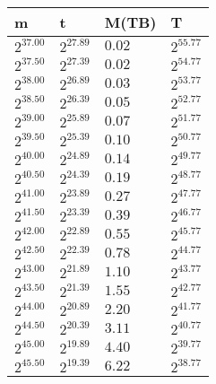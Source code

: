 \begin{tabular}{llll}
m & t & M(TB) & T \\ \hline
$2^{37.00}$ & $2^{27.89}$ & $0.02$ & $2^{55.77}$ \\
$2^{37.50}$ & $2^{27.39}$ & $0.02$ & $2^{54.77}$ \\
$2^{38.00}$ & $2^{26.89}$ & $0.03$ & $2^{53.77}$ \\
$2^{38.50}$ & $2^{26.39}$ & $0.05$ & $2^{52.77}$ \\
$2^{39.00}$ & $2^{25.89}$ & $0.07$ & $2^{51.77}$ \\
$2^{39.50}$ & $2^{25.39}$ & $0.10$ & $2^{50.77}$ \\
$2^{40.00}$ & $2^{24.89}$ & $0.14$ & $2^{49.77}$ \\
$2^{40.50}$ & $2^{24.39}$ & $0.19$ & $2^{48.77}$ \\
$2^{41.00}$ & $2^{23.89}$ & $0.27$ & $2^{47.77}$ \\
$2^{41.50}$ & $2^{23.39}$ & $0.39$ & $2^{46.77}$ \\
$2^{42.00}$ & $2^{22.89}$ & $0.55$ & $2^{45.77}$ \\
$2^{42.50}$ & $2^{22.39}$ & $0.78$ & $2^{44.77}$ \\
$2^{43.00}$ & $2^{21.89}$ & $1.10$ & $2^{43.77}$ \\
$2^{43.50}$ & $2^{21.39}$ & $1.55$ & $2^{42.77}$ \\
$2^{44.00}$ & $2^{20.89}$ & $2.20$ & $2^{41.77}$ \\
$2^{44.50}$ & $2^{20.39}$ & $3.11$ & $2^{40.77}$ \\
$2^{45.00}$ & $2^{19.89}$ & $4.40$ & $2^{39.77}$ \\
$2^{45.50}$ & $2^{19.39}$ & $6.22$ & $2^{38.77}$ \\
\end{tabular}
\\\\
\\\\
